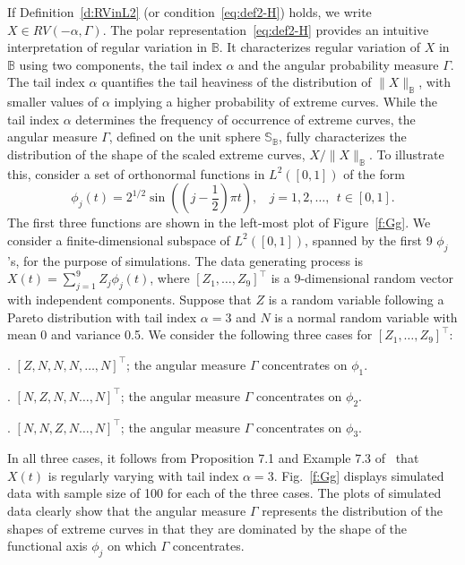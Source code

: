 \documentclass[lineno]{biometrika}
\newcommand \ag{\alpha}
\newcommand \Gg{\Gamma}
\newcommand\mbB{{\mathbb B}}
\newcommand\mbS{{\mathbb S}}
\newcommand\lp{\left (}
\newcommand\rp{\right )}
\begin{document}
If Definition~\ref{d:RVinL2} (or condition~\eqref{eq:def2-H}) holds,
we write $X \in RV(-\ag, \Gg)$. The polar representation~\eqref{eq:def2-H} provides an intuitive interpretation of regular variation in $\mbB$. It characterizes regular variation of $X$ in $\mbB$ using two components, the tail index $\ag$ and the angular probability measure $\Gg$. The tail index $\ag$ quantifies the tail heaviness of the distribution of $\|X\|_{\mbB}$, with smaller values of $\ag$ implying a higher probability of extreme curves. While the tail index $\ag$ determines the frequency of occurrence of extreme curves, the angular measure $\Gg$, defined on the unit sphere $\mbS_{\mbB}$, fully characterizes the distribution of the shape of the scaled extreme curves, $X/\|X\|_{\mbB}$. To illustrate this, consider a set of orthonormal functions in $L^2([0,1])$ of the form
\begin{equation} \label{eq:basis}
\phi_j(t) = 2^{1/2} \sin \lp \lp j-\frac{1}{2}\rp \pi t\rp, \ \ \ \ j=1,2,\ldots, \ \ t \in [0,1].
\end{equation}
The first three functions are shown in the left-most plot of Figure~\ref{f:Gg}. We consider a finite-dimensional subspace of $L^2([0,1])$, spanned by the first 9 $\phi_j$'s, for the purpose of simulations. The data generating process is
$X(t) = \sum_{j=1}^{9} Z_{j} \phi_j(t)$,
where $[Z_1, \ldots, Z_9]^{\top}$ is a 9-dimensional random vector with independent components. Suppose that $Z$ is a random variable following a Pareto distribution with tail index $\ag=3$ and $N$ is a normal random variable with mean 0 and variance 0.5. We consider the following three cases for $[Z_1, \ldots, Z_9]^{\top}$:

\medskip

. $[Z, N, N, N, \ldots, N]^{\top}$; the angular measure $\Gg$ concentrates on $\phi_1$.

. $[N, Z, N, N \ldots, N]^{\top}$; the angular measure $\Gg$ concentrates on $\phi_2$.

. $[N, N, Z, N \ldots, N]^{\top}$; the angular measure $\Gg$ concentrates on $\phi_3$.

\medskip

In all three cases, it follows from Proposition 7.1 and Example 7.3 of~\citet{meinguet:segers:2010} that $X(t)$ is regularly varying with tail index $\ag=3$.
Fig.~\ref{f:Gg} displays simulated data with sample size of 100 for each of the three cases. The plots of simulated data clearly show that the angular measure $\Gg$ represents the distribution of the shapes of extreme curves in that they are dominated by the shape of the functional axis $\phi_j$ on which $\Gg$ concentrates.
\end{document}
